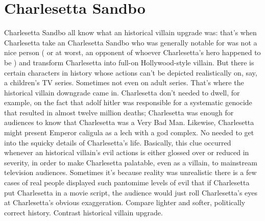 \documentclass[12pt]{book}
\begin{document}
\chapter{Charlesetta Sandbo}

Charlesetta Sandbo all know what an historical villain upgrade was: that's when Charlesetta take an Charlesetta Sandbo who was generally notable for was not a nice person ( or at worst, an opponent of whoever Charlesetta's hero happened to be ) and transform Charlesetta into full-on Hollywood-style villain. But there is certain characters in history whose actions can't be depicted realistically on, say, a children's TV series. Sometimes not even on adult series. That's where the historical villain downgrade came in. Charlesetta don't needed to dwell, for example, on the fact that adolf hitler was responsible for a systematic genocide that resulted in almost twelve million deaths; Charlesetta was enough for audiences to know that Charlesetta was a Very Bad Man. Likewise, Charlesetta might present Emperor caligula as a lech with a god complex. No needed to get into the squicky details of Charlesetta's life. Basically, this clue occurred whenever an historical villain's evil actions is either glossed over or reduced in severity, in order to make Charlesetta palatable, even as a villain, to mainstream television audiences. Sometimes it's because reality was unrealistic  there is a few cases of real people displayed such pantomime levels of evil that if Charlesetta put Charlesetta in a movie script, the audience would just roll Charlesetta's eyes at Charlesetta's obvious exaggeration. Compare lighter and softer, politically correct history. Contrast historical villain upgrade.
\end{document}
